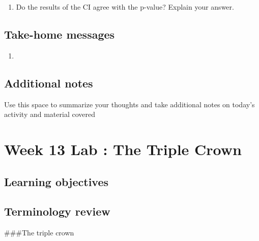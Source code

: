 \documentclass[
]{report}
\providecommand{\tightlist}{%
  \setlength{\itemsep}{0pt}\setlength{\parskip}{0pt}}
\begin{document}
\vspace{1in}

\begin{enumerate}
\def\labelenumi{\arabic{enumi}.}
\setcounter{enumi}{12}
\tightlist
\item
  Do the results of the CI agree with the p-value? Explain your answer.
\end{enumerate}

\vspace{0.5in}

\hypertarget{take-home-messages-19}{%
\subsection{Take-home messages}\label{take-home-messages-19}}

\begin{enumerate}
\def\labelenumi{\arabic{enumi}.}
\tightlist
\item
\end{enumerate}

\hypertarget{additional-notes-16}{%
\subsection{Additional notes}\label{additional-notes-16}}

Use this space to summarize your thoughts and take additional notes on today's activity and material covered

\newpage

\hypertarget{week-13-lab-the-triple-crown}{%
\section{Week 13 Lab : The Triple Crown}\label{week-13-lab-the-triple-crown}}


\hypertarget{learning-objectives-21}{%
\subsection{Learning objectives}\label{learning-objectives-21}}

\hypertarget{terminology-review-23}{%
\subsection{Terminology review}\label{terminology-review-23}}

\#\#\#The triple crown
\end{document}
